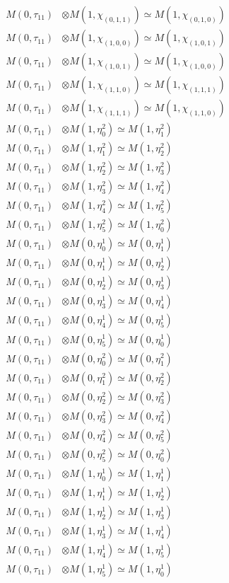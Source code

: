 \begin{align*}
M(0,\tau_{11}) &\otimes M(1,\chi_{(0,1,1)}) \simeq M(1,\chi_{(0,1,0)}) \\
M(0,\tau_{11}) &\otimes M(1,\chi_{(1,0,0)}) \simeq M(1,\chi_{(1,0,1)}) \\
M(0,\tau_{11}) &\otimes M(1,\chi_{(1,0,1)}) \simeq M(1,\chi_{(1,0,0)}) \\
M(0,\tau_{11}) &\otimes M(1,\chi_{(1,1,0)}) \simeq M(1,\chi_{(1,1,1)}) \\
M(0,\tau_{11}) &\otimes M(1,\chi_{(1,1,1)}) \simeq M(1,\chi_{(1,1,0)}) \\
M(0,\tau_{11}) &\otimes M(1,\eta^{2}_{0}) \simeq M(1,\eta^{2}_{1}) \\
M(0,\tau_{11}) &\otimes M(1,\eta^{2}_{1}) \simeq M(1,\eta^{2}_{2}) \\
M(0,\tau_{11}) &\otimes M(1,\eta^{2}_{2}) \simeq M(1,\eta^{2}_{3}) \\
M(0,\tau_{11}) &\otimes M(1,\eta^{2}_{3}) \simeq M(1,\eta^{2}_{4}) \\
M(0,\tau_{11}) &\otimes M(1,\eta^{2}_{4}) \simeq M(1,\eta^{2}_{5}) \\
M(0,\tau_{11}) &\otimes M(1,\eta^{2}_{5}) \simeq M(1,\eta^{2}_{0}) \\
M(0,\tau_{11}) &\otimes M(0,\eta^{1}_{0}) \simeq M(0,\eta^{1}_{1}) \\
M(0,\tau_{11}) &\otimes M(0,\eta^{1}_{1}) \simeq M(0,\eta^{1}_{2}) \\
M(0,\tau_{11}) &\otimes M(0,\eta^{1}_{2}) \simeq M(0,\eta^{1}_{3}) \\
M(0,\tau_{11}) &\otimes M(0,\eta^{1}_{3}) \simeq M(0,\eta^{1}_{4}) \\
M(0,\tau_{11}) &\otimes M(0,\eta^{1}_{4}) \simeq M(0,\eta^{1}_{5}) \\
M(0,\tau_{11}) &\otimes M(0,\eta^{1}_{5}) \simeq M(0,\eta^{1}_{0}) \\
M(0,\tau_{11}) &\otimes M(0,\eta^{2}_{0}) \simeq M(0,\eta^{2}_{1}) \\
M(0,\tau_{11}) &\otimes M(0,\eta^{2}_{1}) \simeq M(0,\eta^{2}_{2}) \\
M(0,\tau_{11}) &\otimes M(0,\eta^{2}_{2}) \simeq M(0,\eta^{2}_{3}) \\
M(0,\tau_{11}) &\otimes M(0,\eta^{2}_{3}) \simeq M(0,\eta^{2}_{4}) \\
M(0,\tau_{11}) &\otimes M(0,\eta^{2}_{4}) \simeq M(0,\eta^{2}_{5}) \\
M(0,\tau_{11}) &\otimes M(0,\eta^{2}_{5}) \simeq M(0,\eta^{2}_{0}) \\
M(0,\tau_{11}) &\otimes M(1,\eta^{1}_{0}) \simeq M(1,\eta^{1}_{1}) \\
M(0,\tau_{11}) &\otimes M(1,\eta^{1}_{1}) \simeq M(1,\eta^{1}_{2}) \\
M(0,\tau_{11}) &\otimes M(1,\eta^{1}_{2}) \simeq M(1,\eta^{1}_{3}) \\
M(0,\tau_{11}) &\otimes M(1,\eta^{1}_{3}) \simeq M(1,\eta^{1}_{4}) \\
M(0,\tau_{11}) &\otimes M(1,\eta^{1}_{4}) \simeq M(1,\eta^{1}_{5}) \\
M(0,\tau_{11}) &\otimes M(1,\eta^{1}_{5}) \simeq M(1,\eta^{1}_{0}) \\
\end{align*}

